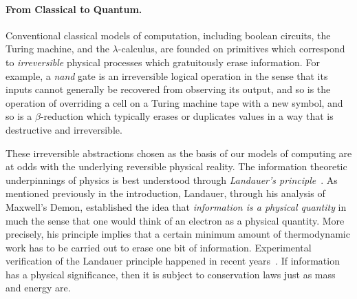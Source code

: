 \documentclass{article}
\newcommand{\jc}[1]{\fbox{Jacques says:} \textbf{#1}}
\begin{document}
\begin{comment}
\jc{The reason I commented this out is that it is under-justified. The
reader will simply not understand what these next few lines are really
saying.}
Indeed one should take the physical principles underlying quantum mechanics,
the most successful physical theory known to us and adapt computation to
``learn'' from these principles. To illustrate the depth of our crisis, Scott
Aaronson, Umesh Vazirani, and others have proposed the following puzzle.

One of these wild claims must be true!:
\begin{itemize}
\item the extended Church-Turing thesis is false, or
\item quantum physics is false, or
\item there is an efficient classical algorithm for factoring
\end{itemize}
Indeed, if quantum physics is correct then there is an efficient quantum
algorithm for factoring (Shor). If there is no efficient classical algorithm
for factoring then the extended Church-Turing thesis is false.
\end{comment}

\paragraph*{From Classical to Quantum.}
Conventional classical models of computation, including boolean
circuits, the Turing machine, and the $\lambda$-calculus, are founded on
primitives which correspond to \emph{irreversible} physical processes which
gratuitously erase information.  For example, a \emph{nand} gate is an
irreversible logical operation in the sense that its inputs cannot generally
be recovered from observing its output, and so is the operation of overriding
a cell on a Turing machine tape with a new symbol, and so is a
$\beta$-reduction which typically erases or duplicates values in a way that
is destructive and irreversible.

These irreversible abstractions chosen as the basis of our
models of computing are at odds with the underlying
reversible physical reality. The information theoretic underpinnings
of physics is best understood through \emph{Landauer's
principle}~\cite{Landauer:1961}. As mentioned previously in the
introduction, Landauer, through his analysis of
Maxwell's Demon, established the idea that \emph{information is a
physical quantity} in much the sense that one would think of an
electron as a physical quantity. More precisely, his principle implies
that a certain minimum amount of
thermodynamic work has to be carried out to erase one bit of
information. Experimental verification of the Landauer principle
happened in recent years~\cite{berut2012experimental}. If information
has a physical significance, then it is subject to conservation laws
just as mass and energy are.
\end{document}
